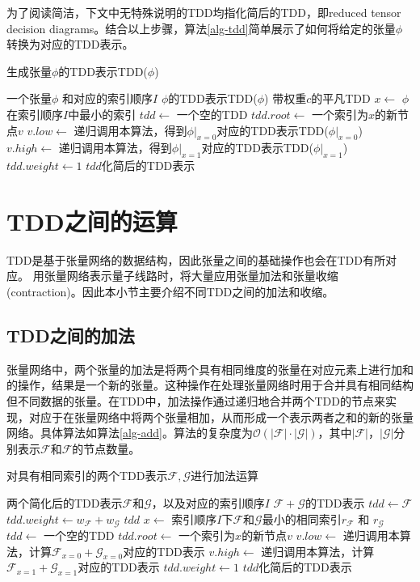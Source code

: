 为了阅读简洁，下文中无特殊说明的TDD均指化简后的TDD，即reduced tensor decision diagrams。结合以上步骤，算法\ref{alg-tdd}简单展示了如何将给定的张量\(\phi\)转换为对应的TDD表示。
\begin{algorithm}
    \caption{生成张量\(\phi\)的TDD表示TDD(\(\phi\))}
    \label{alg-tdd}
    \begin{algorithmic}[1]
    \Require 一个张量\(\phi\) 和对应的索引顺序\(I\)
    \Ensure \(\phi\)的TDD表示TDD(\(\phi\))
        \State \Return 带权重$c$的平凡TDD
    \EndIf
    \State \(x \gets\) \(\phi\)在索引顺序\(I\)中最小的索引
    \State \(tdd \gets\) 一个空的TDD
    \State \(tdd.root \gets\) 一个索引为\(x\)的新节点\(v\) 
    \State \(v.low \gets\) 递归调用本算法，得到\(\phi|_{x=0}\)对应的TDD表示TDD(\(\phi|_{x=0}\))
    \State \(v.high \gets\) 递归调用本算法，得到\(\phi|_{x=1}\)对应的TDD表示TDD(\(\phi|_{x=1}\))
    \State \(tdd.weight \gets 1\)
    \State \Return \(tdd\)化简后的TDD表示
    \end{algorithmic}
\end{algorithm}


\section{TDD之间的运算}
TDD是基于张量网络的数据结构，因此张量之间的基础操作也会在TDD有所对应。
用张量网络表示量子线路时，将大量应用张量加法和张量收缩(contraction)。因此本小节主要介绍不同TDD之间的加法和收缩。
\subsection*{TDD之间的加法}
张量网络中，两个张量的加法是将两个具有相同维度的张量在对应元素上进行加和的操作，结果是一个新的张量。这种操作在处理张量网络时用于合并具有相同结构但不同数据的张量。在TDD中，加法操作通过递归地合并两个TDD的节点来实现，对应于在张量网络中将两个张量相加，从而形成一个表示两者之和的新的张量网络。具体算法如算法\ref{alg-add}。算法的复杂度为\(\mathcal{O}(|\mathcal{F}|\cdot|\mathcal{G}|)\)，其中\(|\mathcal{F}|\)，\(|\mathcal{G}|\)分别表示\(\mathcal{F}\)和\(\mathcal{F}\)的节点数量。
\begin{algorithm}
\caption{对具有相同索引的两个TDD表示\(\mathcal{F}, \mathcal{G}\)进行加法运算}
\label{alg-add}
\begin{algorithmic}[1]
\Require 两个简化后的TDD表示\(\mathcal{F}\)和\(\mathcal{G}\)，以及对应的索引顺序\(I\)
\Ensure \(\mathcal{F} + \mathcal{G}\)的TDD表示
    \State \(tdd \gets \mathcal{F}\)
    \State \(tdd.weight \gets w_{\mathcal{F}} + w_{\mathcal{G}}\)
    \State \Return \(tdd\)
\EndIf
\State \(x \gets\) 索引顺序\(I\)下\(\mathcal{F}\)和\(\mathcal{G}\)最小的相同索引\(r_{\mathcal{F}}\) 和 \(r_{\mathcal{G}}\)
\State \(tdd \gets\) 一个空的TDD
\State \(tdd.root \gets\) 一个索引为\(x\)的新节点\(v\)
\State \(v.low \gets\) 递归调用本算法，计算\(\mathcal{F}_{x=0} + \mathcal{G}_{x=0}\)对应的TDD表示
\State \(v.high \gets\) 递归调用本算法，计算\(\mathcal{F}_{x=1} + \mathcal{G}_{x=1}\)对应的TDD表示
\State \(tdd.weight \gets 1\)
\State \Return \(tdd\)化简后的TDD表示
\end{algorithmic}
\end{algorithm}

